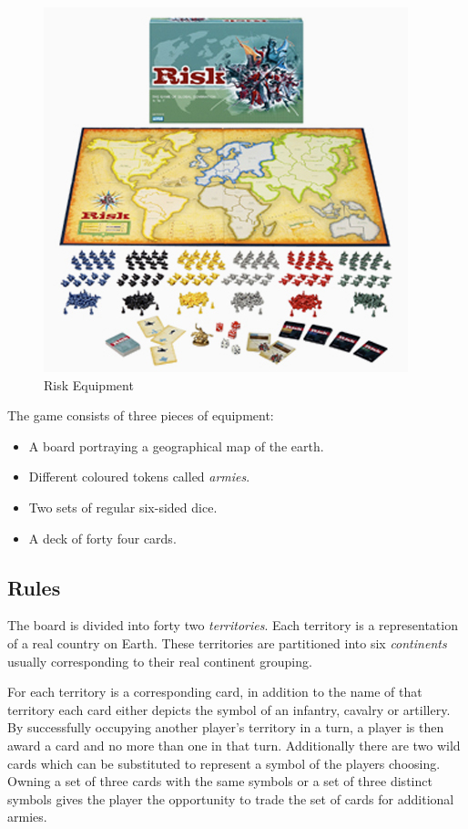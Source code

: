 \documentclass[parskip]{cs4rep}
\begin{document}
\begin{figure}[h]
\centering
\includegraphics{images/risk-board}
\caption{Risk Equipment}
\label{fig:risk-equipment}
\end{figure}

The game consists of three pieces of equipment:

\begin{itemize}
\item
A board portraying a geographical map of the earth.
\item
Different coloured tokens called \textit{armies}.
\item
Two sets of regular six-sided dice.
\item
A deck of forty four cards.
\end{itemize}

\subsection{Rules}

The board is divided into forty two \textit{territories}. Each territory is a representation of a real country on Earth. These territories are partitioned into six \textit{continents} usually corresponding to their real continent grouping.

For each territory is a corresponding card, in addition to the name of that territory each card either depicts the symbol of an infantry, cavalry or artillery. By successfully occupying another player's territory in a turn, a player is then award a card and no more than one in that turn. Additionally there are two wild cards which can be substituted to represent a symbol of the players choosing.
Owning a set of three cards with the same symbols or a set of three distinct symbols gives the player the opportunity to trade the set of cards for additional armies.
\end{document}
